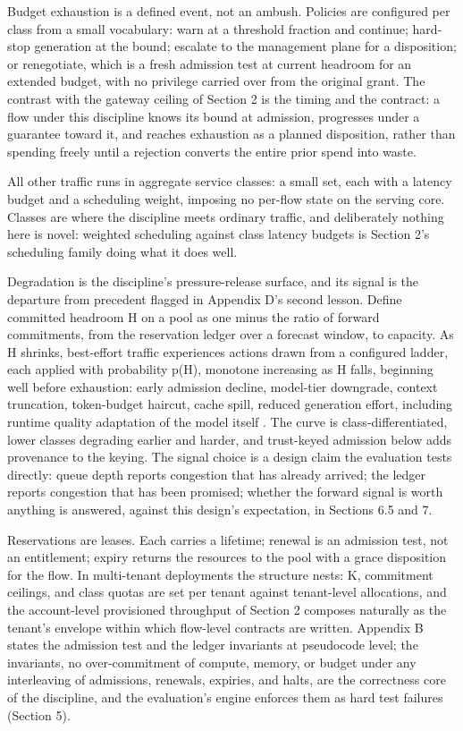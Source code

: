 Budget exhaustion is a defined event, not an ambush. Policies are
configured per class from a small vocabulary: warn at a threshold
fraction and continue; hard-stop generation at the bound; escalate to the
management plane for a disposition; or renegotiate, which is a fresh
admission test at current headroom for an extended budget, with no
privilege carried over from the original grant. The contrast with the
gateway ceiling of Section 2 is the timing and the contract: a flow under
this discipline knows its bound at admission, progresses under a
guarantee toward it, and reaches exhaustion as a planned disposition,
rather than spending freely until a rejection converts the entire prior
spend into waste.

All other traffic runs in aggregate service classes: a small set, each
with a latency budget and a scheduling weight, imposing no per-flow state
on the serving core. Classes are where the discipline meets ordinary
traffic, and deliberately nothing here is novel: weighted scheduling
against class latency budgets is Section 2's scheduling family doing what
it does well.

Degradation is the discipline's pressure-release surface, and its signal
is the departure from precedent flagged in Appendix D's second lesson.
Define committed headroom H on a pool as one minus the ratio of forward
commitments, from the reservation ledger over a forecast window, to
capacity. As H shrinks, best-effort traffic experiences actions drawn
from a configured ladder, each applied with probability p(H), monotone
increasing as H falls, beginning well before exhaustion: early admission
decline, model-tier downgrade, context truncation, token-budget haircut,
cache spill, reduced generation effort, including runtime quality
adaptation of the model itself \citep{morphserve2025}. The curve is
class-differentiated, lower classes degrading earlier and harder, and
trust-keyed admission below adds provenance to the keying. The signal
choice is a design claim the evaluation tests directly: queue depth
reports congestion that has already arrived; the ledger reports
congestion that has been promised; whether the forward signal is worth
anything is answered, against this design's expectation, in Sections 6.5
and 7.

Reservations are leases. Each carries a lifetime; renewal is an admission
test, not an entitlement; expiry returns the resources to the pool with a
grace disposition for the flow. In multi-tenant deployments the structure
nests: K, commitment ceilings, and class quotas are set per tenant
against tenant-level allocations, and the account-level provisioned
throughput of Section 2 composes naturally as the tenant's envelope
within which flow-level contracts are written. Appendix B states the admission test and the ledger invariants at pseudocode level; the
invariants, no over-commitment of compute, memory, or budget under any
interleaving of admissions, renewals, expiries, and halts, are the
correctness core of the discipline, and the evaluation's engine enforces
them as hard test failures (Section 5).

